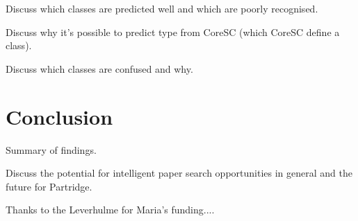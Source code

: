 \documentclass{svmult}
\begin{document}
Discuss which classes are predicted well and which are poorly recognised.

Discuss why it's possible to predict type from CoreSC (which CoreSC define a class).

Discuss which classes are confused and why. 



\section{Conclusion}
\label{sec:4}

Summary of findings.

Discuss the potential for intelligent paper search opportunities in general and the future for Partridge.

\begin{acknowledgement}
Thanks to the Leverhulme for Maria's funding....
\end{acknowledgement}





%
\end{document}
